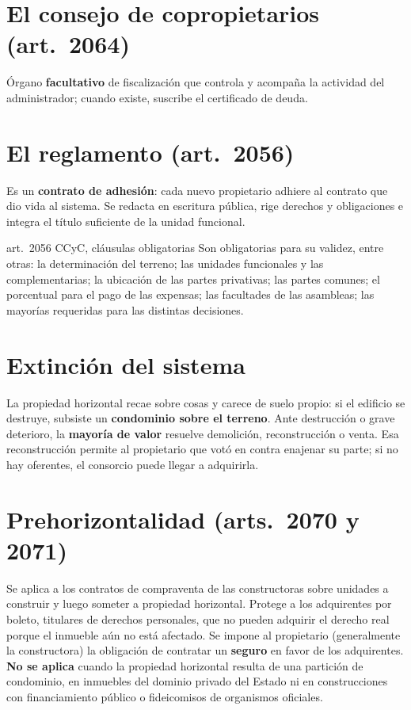 \documentclass[12pt,oneside]{book}
\begin{document}
\section{El consejo de copropietarios (art.~2064)}

Órgano \textbf{facultativo} de fiscalización que controla y acompaña la actividad del administrador; cuando existe, suscribe el certificado de deuda.

\section{El reglamento (art.~2056)}

Es un \textbf{contrato de adhesión}: cada nuevo propietario adhiere al contrato que dio vida al sistema. Se redacta en escritura pública, rige derechos y obligaciones e integra el título suficiente de la unidad funcional.

\begin{regla}{art.~2056 CCyC, cláusulas obligatorias}
Son obligatorias para su validez, entre otras: la determinación del terreno; las unidades funcionales y las complementarias; la ubicación de las partes privativas; las partes comunes; el porcentual para el pago de las expensas; las facultades de las asambleas; las mayorías requeridas para las distintas decisiones.
\end{regla}

\section{Extinción del sistema}

La propiedad horizontal recae sobre cosas y carece de suelo propio: si el edificio se destruye, subsiste un \textbf{condominio sobre el terreno}. Ante destrucción o grave deterioro, la \textbf{mayoría de valor} resuelve demolición, reconstrucción o venta. Esa reconstrucción permite al propietario que votó en contra enajenar su parte; si no hay oferentes, el consorcio puede llegar a adquirirla.

\section{Prehorizontalidad (arts.~2070 y 2071)}

Se aplica a los contratos de compraventa de las constructoras sobre unidades a construir y luego someter a propiedad horizontal. Protege a los adquirentes por boleto, titulares de derechos personales, que no pueden adquirir el derecho real porque el inmueble aún no está afectado. Se impone al propietario (generalmente la constructora) la obligación de contratar un \textbf{seguro} en favor de los adquirentes. \textbf{No se aplica} cuando la propiedad horizontal resulta de una partición de condominio, en inmuebles del dominio privado del Estado ni en construcciones con financiamiento público o fideicomisos de organismos oficiales.
\end{document}
